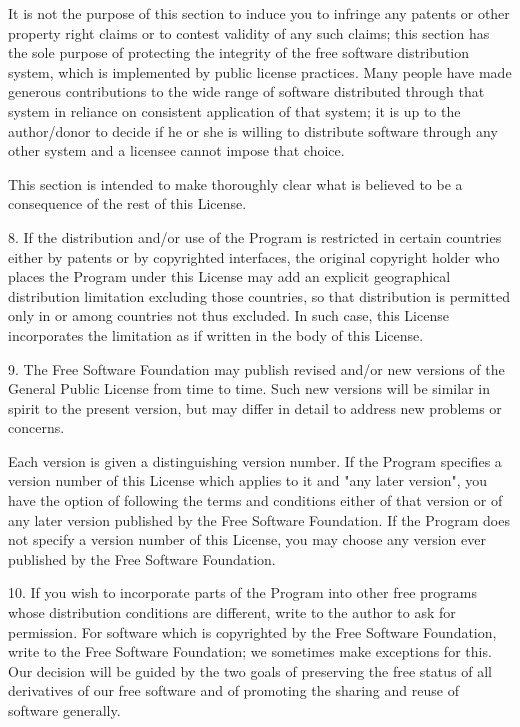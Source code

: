 \documentclass[11pt,a4paper]{article}
\begin{document}
\begin{itemize}
		It is not the purpose of this section to induce you to infringe any
		patents or other property right claims or to contest validity of any
		such claims; this section has the sole purpose of protecting the
		integrity of the free software distribution system, which is
		implemented by public license practices.  Many people have made
		generous contributions to the wide range of software distributed
		through that system in reliance on consistent application of that
		system; it is up to the author/donor to decide if he or she is willing
		to distribute software through any other system and a licensee cannot
		impose that choice.

		This section is intended to make thoroughly clear what is believed to
		be a consequence of the rest of this License.

		8. If the distribution and/or use of the Program is restricted in
		certain countries either by patents or by copyrighted interfaces, the
		original copyright holder who places the Program under this License
		may add an explicit geographical distribution limitation excluding
		those countries, so that distribution is permitted only in or among
		countries not thus excluded.  In such case, this License incorporates
		the limitation as if written in the body of this License.

		9. The Free Software Foundation may publish revised and/or new versions
		of the General Public License from time to time.  Such new versions will
		be similar in spirit to the present version, but may differ in detail to
		address new problems or concerns.

		Each version is given a distinguishing version number.  If the Program
		specifies a version number of this License which applies to it and "any
		later version", you have the option of following the terms and conditions
		either of that version or of any later version published by the Free
		Software Foundation.  If the Program does not specify a version number of
		this License, you may choose any version ever published by the Free Software
		Foundation.

		10. If you wish to incorporate parts of the Program into other free
		programs whose distribution conditions are different, write to the author
		to ask for permission.  For software which is copyrighted by the Free
		Software Foundation, write to the Free Software Foundation; we sometimes
		make exceptions for this.  Our decision will be guided by the two goals
		of preserving the free status of all derivatives of our free software and
		of promoting the sharing and reuse of software generally.


\end{itemize}
\end{document}
